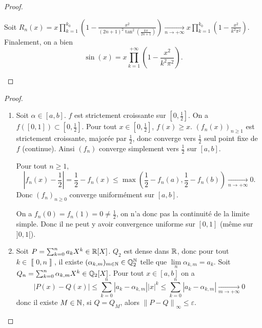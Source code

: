 \begin{proof}
\begin{enumerate}
    Soit $R_{n}(x)=x\prod_{k=1}^{k_{0}}\left(1-\frac{x^{2}}{(2n+1)^{2}\tan^{2}\left(\frac{k\pi}{2n+1}\right)}\right)\xrightarrow[n\to+\infty]{}x\prod_{k=1}^{k_{0}}\left(1-\frac{x^{2}}{k^{2}\pi^{2}}\right)$. Finalement, on a bien 
    \begin{equation}
        \boxed{
            \sin(x)=x\prod_{k=1}^{+\infty}\left(1-\frac{x^{2}}{k^{2}\pi^{2}}\right).
        }
    \end{equation}
    \end{enumerate}
\end{proof}

\begin{proof}
    \phantom{}
    \begin{enumerate}
        \item Soit $\alpha\in[a,b]$. $f$ est strictement croissante sur $\left[0,\frac{1}{2}\right]$. On a $f\left(\left[0,1\right]\right)\subset\left[0,\frac{1}{2}\right]$. Pour tout $x\in\left[0,\frac{1}{2}\right]$, $f(x)\geqslant x$. $(f_{n}(x))_{n\geqslant1}$ est strictement croissante, majorée par $\frac{1}{2}$, donc converge vers $\frac{1}{2}$ seul point fixe de $f$ (continue). Ainsi $(f_{n})$ converge simplement vers $\frac{1}{2}$ sur $[a,b]$.
        
        Pour tout $n\geqslant1$,
        \begin{equation}
            \left\lvert f_{n}(x)-\frac{1}{2}\right\rvert=\frac{1}{2}-f_{n}(x)\leqslant\max\left(\frac{1}{2}-f_{n}(a),\frac{1}{2}-f_{n}(b)\right)\xrightarrow[n\to+\infty]{}0.
        \end{equation}
        Donc $(f_{n})_{n\geqslant0}$ converge uniformément sur $[a,b]$.

        On a $f_{n}(0)=f_{n}(1)=0\neq\frac{1}{2}$, on n'a donc pas la continuité de la limite simple. Donc il ne peut y avoir convergence uniforme sur $[0,1]$ (même sur $]0,1[$).

        \item Soit $P=\sum_{k=0}^{n}a_{k}X^{k}\in\mathbb{R}[X]$. $Q_{2}$ est dense dans $\mathbb{R}$, donc pour tout $k\in\left\llbracket0,n\right\rrbracket$, il existe $(\alpha_{k,m})_{m\in\mathbb{N}}\in\mathbb{Q}_{2}^{\mathbb{N}}$ telle que $\lim\limits_{n}\alpha_{k,m}=a_{k}$. Soit $Q_{n}=\sum_{k=0}^{n}\alpha_{k,m}X^{k}\in\mathbb{Q}_{2}[X]$. Pour tout $x\in[a,b]$ on a 
        \begin{equation}
            \left\lvert P(x)-Q(x)\right\rvert\leqslant\sum_{k=0}^{n}\left\lvert a_{k}-\alpha_{k,m}\right\rvert\left\lvert x\right\rvert^{k}\leqslant\sum_{k=0}^{n}\left\lvert a_{k}-\alpha_{k,m}\right\rvert\xrightarrow[m\to+\infty]{}0    
        \end{equation}
        donc il existe $M\in\mathbb{N}$, si $Q=Q_{M}$, alors $\left\lVert P-Q\right\rVert_{\infty}\leqslant\varepsilon$.


\end{enumerate}
\end{proof}
